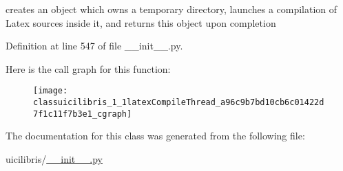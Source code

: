 creates an object which owns a temporary directory, launches a compilation of \-Latex sources inside it, and returns this object upon completion 



\-Definition at line 547 of file \-\_\-\-\_\-init\-\_\-\-\_\-.\-py.



\-Here is the call graph for this function\-:
\nopagebreak
\begin{figure}[H]
\begin{center}
\leavevmode
\texttt{[image: classuicilibris\_1\_1latexCompileThread\_a96c9b7bd10cb6c01422d7f1c11f7b3e1\_cgraph]}
\end{center}
\end{figure}




\-The documentation for this class was generated from the following file\-:\begin{DoxyCompactItemize}
\item 
uicilibris/\hyperlink{____init_____8py}{\-\_\-\-\_\-init\-\_\-\-\_\-.\-py}\end{DoxyCompactItemize}
